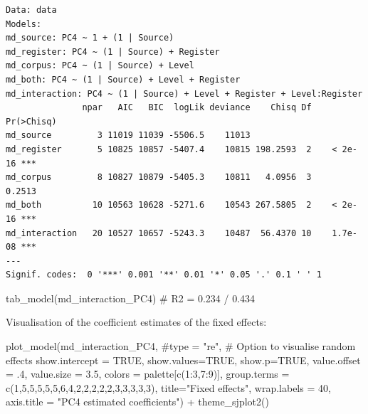 \documentclass[
  letterpaper,
  DIV=11,
  numbers=noendperiod]{scrreprt}
\newenvironment{Shaded}{\begin{snugshade}}{\end{snugshade}}
\newcommand{\AttributeTok}[1]{\textcolor[rgb]{0.40,0.45,0.13}{#1}}
\newcommand{\CommentTok}[1]{\textcolor[rgb]{0.37,0.37,0.37}{#1}}
\newcommand{\ConstantTok}[1]{\textcolor[rgb]{0.56,0.35,0.01}{#1}}
\newcommand{\DecValTok}[1]{\textcolor[rgb]{0.68,0.00,0.00}{#1}}
\newcommand{\FloatTok}[1]{\textcolor[rgb]{0.68,0.00,0.00}{#1}}
\newcommand{\FunctionTok}[1]{\textcolor[rgb]{0.28,0.35,0.67}{#1}}
\newcommand{\NormalTok}[1]{\textcolor[rgb]{0.00,0.23,0.31}{#1}}
\newcommand{\SpecialCharTok}[1]{\textcolor[rgb]{0.37,0.37,0.37}{#1}}
\newcommand{\StringTok}[1]{\textcolor[rgb]{0.13,0.47,0.30}{#1}}
\begin{document}
\begin{verbatim}
Data: data
Models:
md_source: PC4 ~ 1 + (1 | Source)
md_register: PC4 ~ (1 | Source) + Register
md_corpus: PC4 ~ (1 | Source) + Level
md_both: PC4 ~ (1 | Source) + Level + Register
md_interaction: PC4 ~ (1 | Source) + Level + Register + Level:Register
               npar   AIC   BIC  logLik deviance    Chisq Df Pr(>Chisq)    
md_source         3 11019 11039 -5506.5    11013                           
md_register       5 10825 10857 -5407.4    10815 198.2593  2    < 2e-16 ***
md_corpus         8 10827 10879 -5405.3    10811   4.0956  3     0.2513    
md_both          10 10563 10628 -5271.6    10543 267.5805  2    < 2e-16 ***
md_interaction   20 10527 10657 -5243.3    10487  56.4370 10    1.7e-08 ***
---
Signif. codes:  0 '***' 0.001 '**' 0.01 '*' 0.05 '.' 0.1 ' ' 1
\end{verbatim}

\begin{Shaded}
\begin{Highlighting}[]
\FunctionTok{tab\_model}\NormalTok{(md\_interaction\_PC4) }\CommentTok{\# R2 = 0.234 / 0.434}
\end{Highlighting}
\end{Shaded}

Visualisation of the coefficient estimates of the fixed effects:

\begin{Shaded}
\begin{Highlighting}[]
\FunctionTok{plot\_model}\NormalTok{(md\_interaction\_PC4, }
           \CommentTok{\#type = "re", \# Option to visualise random effects }
           \AttributeTok{show.intercept =} \ConstantTok{TRUE}\NormalTok{,}
           \AttributeTok{show.values=}\ConstantTok{TRUE}\NormalTok{, }
           \AttributeTok{show.p=}\ConstantTok{TRUE}\NormalTok{,}
           \AttributeTok{value.offset =}\NormalTok{ .}\DecValTok{4}\NormalTok{,}
           \AttributeTok{value.size =} \FloatTok{3.5}\NormalTok{,}
           \AttributeTok{colors =}\NormalTok{ palette[}\FunctionTok{c}\NormalTok{(}\DecValTok{1}\SpecialCharTok{:}\DecValTok{3}\NormalTok{,}\DecValTok{7}\SpecialCharTok{:}\DecValTok{9}\NormalTok{)],}
           \AttributeTok{group.terms =} \FunctionTok{c}\NormalTok{(}\DecValTok{1}\NormalTok{,}\DecValTok{5}\NormalTok{,}\DecValTok{5}\NormalTok{,}\DecValTok{5}\NormalTok{,}\DecValTok{5}\NormalTok{,}\DecValTok{5}\NormalTok{,}\DecValTok{6}\NormalTok{,}\DecValTok{4}\NormalTok{,}\DecValTok{2}\NormalTok{,}\DecValTok{2}\NormalTok{,}\DecValTok{2}\NormalTok{,}\DecValTok{2}\NormalTok{,}\DecValTok{2}\NormalTok{,}\DecValTok{3}\NormalTok{,}\DecValTok{3}\NormalTok{,}\DecValTok{3}\NormalTok{,}\DecValTok{3}\NormalTok{,}\DecValTok{3}\NormalTok{), }
           \AttributeTok{title=}\StringTok{"Fixed effects"}\NormalTok{,}
           \AttributeTok{wrap.labels =} \DecValTok{40}\NormalTok{,}
           \AttributeTok{axis.title =} \StringTok{"PC4 estimated coefficients"}\NormalTok{) }\SpecialCharTok{+}
  \FunctionTok{theme\_sjplot2}\NormalTok{() }
\end{Highlighting}
\end{Shaded}
\end{document}
